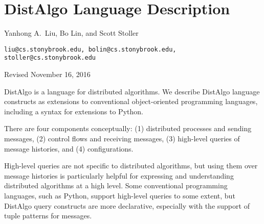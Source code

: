 \documentclass[12pt]{article}
\newcommand{\notes}[1]{} %
\newcommand{\body}[1]{} %
\newcommand{\mysubsec}[1]{\subsection*{#1}}
\newcommand{\myparag}[1]{\vspace{2ex}\noindent\b{#1.}~}
\newcommand\m[1]{$#1$} %
\renewcommand\c[1]{{\tt\small #1}} %
\renewcommand\b[1]{{\bf #1}} %
\renewcommand{\|}{\mathify{\,\mbox{\c{|}}\,}} %
\renewcommand{\=}{\mathify{\,=\,}\linebreak[0]}
\begin{document}
\body{} %

\newpage
\appendix

\renewcommand{\thesection}{\arabic{section}}

\setcounter{page}{1}
\setcounter{section}{0}


\notes{}

\section*{{\Large DistAlgo Language Description}}

{\large Yanhong A.\ Liu, Bo Lin, and Scott Stoller}

\c{liu@cs.stonybrook.edu, bolin@cs.stonybrook.edu, stoller@cs.stonybrook.edu}

{\small Revised November 16, 2016}
\vspace{4ex}

\def\da{\vspace{-2.5ex}in DistAlgo\vspace{-2.5ex}}
\def\langmap{\vspace{.5ex}\m{\longrightarrow}~\b{in Python syntax:~}
  \vspace{.0ex}}
\newcommand{\alt}[1]{{\bf ---}#1\\{\bf ---}} %
\renewcommand{\mysubsec}[1]{\section{#1}}
\renewcommand{\myparag}[1]{\subsection{#1}}


DistAlgo is a language for distributed algorithms.  We describe DistAlgo
language constructs as extensions to conventional object-oriented
programming languages, including a syntax for extensions to Python.

There are four components conceptually: (1) distributed processes and
sending messages, (2) control flows and receiving messages, (3) high-level
queries of message histories, and (4) configurations.

High-level queries are not specific to distributed algorithms, but using
them over message histories is particularly helpful for expressing and
understanding distributed algorithms at a high level.  Some conventional
programming languages, such as Python, support high-level queries to some
extent, but DistAlgo query constructs are more declarative, especially with
the support of tuple patterns for messages.
\end{document}
